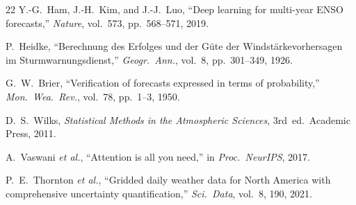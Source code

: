 \documentclass{article}
\begin{document}
{\begin{thebibliography}{22}
Y.-G.~Ham, J.-H.~Kim, and J.-J.~Luo, ``Deep learning for multi-year ENSO forecasts,'' \emph{Nature}, vol.~573, pp.~568--571, 2019.

P.~Heidke, ``Berechnung des Erfolges und der G\"{u}te der Windst\"{a}rkevorhersagen im Sturmwarnungsdienst,'' \emph{Geogr.\ Ann.}, vol.~8, pp.~301--349, 1926.

G.~W.~Brier, ``Verification of forecasts expressed in terms of probability,'' \emph{Mon.\ Wea.\ Rev.}, vol.~78, pp.~1--3, 1950.

D.~S.~Wilks, \emph{Statistical Methods in the Atmospheric Sciences}, 3rd~ed.\ Academic Press, 2011.

A.~Vaswani \emph{et al.}, ``Attention is all you need,'' in \emph{Proc.\ NeurIPS}, 2017.

P.~E.~Thornton \emph{et al.}, ``Gridded daily weather data for North America with comprehensive uncertainty quantification,'' \emph{Sci.\ Data}, vol.~8, 190, 2021.

\end{thebibliography}
}
\end{document}
